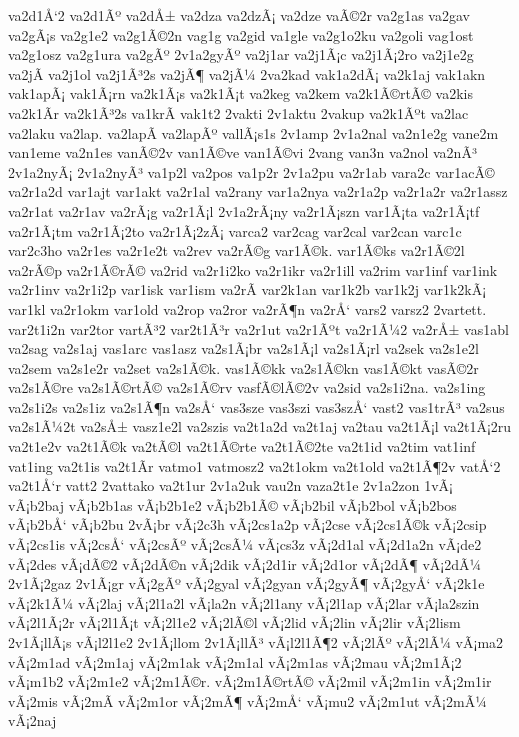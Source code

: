 {va2d1Å‘2
va2d1Ãº
va2dÅ±
va2dza
va2dzÃ¡
va2dze
vaÃ©2r
va2g1as
va2gav
va2gÃ¡s
va2g1e2
va2g1Ã©2n
vag1g
va2gid
va1gle
va2g1o2ku
va2goli
vag1ost
va2g1osz
va2g1ura
va2gÃº
2v1a2gyÃº
va2j1ar
va2j1Ã¡c
va2j1Ã¡2ro
va2j1e2g
va2jÃ­
va2j1ol
va2j1Ã³2s
va2jÃ¶
va2jÃ¼
2va2kad
vak1a2dÃ¡
va2k1aj
vak1akn
vak1apÃ¡
vak1Ã¡rn
va2k1Ã¡s
va2k1Ã¡t
va2keg
va2kem
va2k1Ã©rtÃ©
va2kis
va2k1Ã­r
va2k1Ã³2s
va1krÃ­
vak1t2
2vakti
2v1aktu
2vakup
va2k1Ãºt
va2lac
va2laku
va2lap.
va2lapÃ­
va2lapÃº
vallÃ¡s1s
2v1amp
2v1a2nal
va2n1e2g
vane2m
van1eme
va2n1es
vanÃ©2v
van1Ã©ve
van1Ã©vi
2vang
van3n
va2nol
va2nÃ³
2v1a2nyÃ¡
2v1a2nyÃ³
va1p2l
va2pos
va1p2r
2v1a2pu
va2r1ab
vara2c
var1acÃ©
va2r1a2d
var1ajt
var1akt
va2r1al
va2rany
var1a2nya
va2r1a2p
va2r1a2r
va2r1assz
va2r1at
va2r1av
va2rÃ¡g
va2r1Ã¡l
2v1a2rÃ¡ny
va2r1Ã¡szn
var1Ã¡ta
va2r1Ã¡tf
va2r1Ã¡tm
va2r1Ã¡2to
va2r1Ã¡2zÃ¡
varca2
var2cag
var2cal
var2can
varc1c
var2c3ho
va2r1es
va2r1e2t
va2rev
va2rÃ©g
var1Ã©k.
var1Ã©ks
va2r1Ã©2l
va2rÃ©p
va2r1Ã©rÃ©
va2rid
va2r1i2ko
va2r1ikr
va2r1ill
va2rim
var1inf
var1ink
va2r1inv
va2r1i2p
var1isk
var1ism
va2rÃ­
var2k1an
var1k2b
var1k2j
var1k2kÃ¡
var1kl
va2r1okm
var1old
va2rop
va2ror
va2rÃ¶n
va2rÅ‘
vars2
varsz2
2vartett.
var2t1i2n
var2tor
vartÃ³2
var2t1Ã³r
va2r1ut
va2r1Ãºt
va2r1Ã¼2
va2rÅ±
vas1abl
va2sag
va2s1aj
vas1arc
vas1asz
va2s1Ã¡br
va2s1Ã¡l
va2s1Ã¡rl
va2sek
va2s1e2l
va2sem
va2s1e2r
va2set
va2s1Ã©k.
vas1Ã©kk
va2s1Ã©kn
vas1Ã©kt
vasÃ©2r
va2s1Ã©re
va2s1Ã©rtÃ©
va2s1Ã©rv
vasfÃ©lÃ©2v
va2sid
va2s1i2na.
va2s1ing
va2s1i2s
va2s1iz
va2s1Ã¶n
va2sÅ‘
vas3sze
vas3szi
vas3szÅ‘
vast2
vas1trÃ³
va2sus
va2s1Ã¼2t
va2sÅ±
vasz1e2l
va2szis
va2t1a2d
va2t1aj
va2tau
va2t1Ã¡l
va2t1Ã¡2ru
va2t1e2v
va2t1Ã©k
va2tÃ©l
va2t1Ã©rte
va2t1Ã©2te
va2t1id
va2tim
vat1inf
vat1ing
va2t1is
va2t1Ã­r
vatmo1
vatmosz2
va2t1okm
va2t1old
va2t1Ã¶2v
vatÅ‘2
va2t1Å‘r
vatt2
2vattako
va2t1ur
2v1a2uk
vau2n
vaza2t1e
2v1a2zon
1vÃ¡
vÃ¡b2baj
vÃ¡b2b1as
vÃ¡b2b1e2
vÃ¡b2b1Ã©
vÃ¡b2bil
vÃ¡b2bol
vÃ¡b2bos
vÃ¡b2bÅ‘
vÃ¡b2bu
2vÃ¡br
vÃ¡2c3h
vÃ¡2cs1a2p
vÃ¡2cse
vÃ¡2cs1Ã©k
vÃ¡2csip
vÃ¡2cs1is
vÃ¡2csÅ‘
vÃ¡2csÃº
vÃ¡2csÃ¼
vÃ¡cs3z
vÃ¡2d1al
vÃ¡2d1a2n
vÃ¡de2
vÃ¡2des
vÃ¡dÃ©2
vÃ¡2dÃ©n
vÃ¡2dik
vÃ¡2d1ir
vÃ¡2d1or
vÃ¡2dÃ¶
vÃ¡2dÃ¼
2v1Ã¡2gaz
2v1Ã¡gr
vÃ¡2gÃº
vÃ¡2gyal
vÃ¡2gyan
vÃ¡2gyÃ¶
vÃ¡2gyÅ‘
vÃ¡2k1e
vÃ¡2k1Ã¼
vÃ¡2laj
vÃ¡2l1a2l
vÃ¡la2n
vÃ¡2l1any
vÃ¡2l1ap
vÃ¡2lar
vÃ¡la2szin
vÃ¡2l1Ã¡2r
vÃ¡2l1Ã¡t
vÃ¡2l1e2
vÃ¡2lÃ©l
vÃ¡2lid
vÃ¡2lin
vÃ¡2lir
vÃ¡2lism
2v1Ã¡llÃ¡s
vÃ¡l2l1e2
2v1Ã¡llom
2v1Ã¡llÃ³
vÃ¡l2l1Ã¶2
vÃ¡2lÃº
vÃ¡2lÃ¼
vÃ¡ma2
vÃ¡2m1ad
vÃ¡2m1aj
vÃ¡2m1ak
vÃ¡2m1al
vÃ¡2m1as
vÃ¡2mau
vÃ¡2m1Ã¡2
vÃ¡m1b2
vÃ¡2m1e2
vÃ¡2m1Ã©r.
vÃ¡2m1Ã©rtÃ©
vÃ¡2mil
vÃ¡2m1in
vÃ¡2m1ir
vÃ¡2mis
vÃ¡2mÃ­
vÃ¡2m1or
vÃ¡2mÃ¶
vÃ¡2mÅ‘
vÃ¡mu2
vÃ¡2m1ut
vÃ¡2mÃ¼
vÃ¡2naj
}
